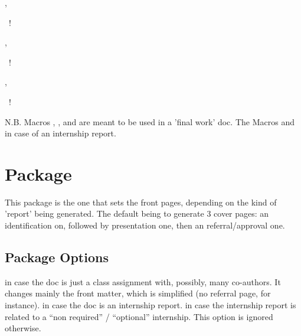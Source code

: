 \documentclass[dctools,english,tocdepth=3,secdepth=3]{ufrgscca} %
\begin{document}
\begin{Macros}{\altexaminer,\altexaminerinfo}%
	\begin{Syntax}%
		~\Macro!{\altexaminer}{}
	\end{Syntax}
\end{Macros}

\begin{Macros}{\tutor,\tutorinfo}%
\begin{Syntax}%
    ~\Macro!{\tutor}{}
\end{Syntax}
\end{Macros}

\begin{Macros}{\supervisor,\supervisorinfo}%
\begin{Syntax}%
    ~\Macro!{\supervisor}{}
\end{Syntax}
\end{Macros}

N.B. Macros \Macro{\advisor}{}, \Macro{\coadvisor}{}, \Macro{\examiner}{} and \Macro{\altexaminer}{} are meant to be used in a 'final work' doc. The Macros \Macro{\tutor}{} and \Macro{\supervisor}{} in case of an internship report.


\section{ Package}
This package is the one that sets the front pages, depending on the kind of 'report' being generated. The default being to generate 3 cover pages: an identification on, followed by presentation one, then an referral/approval one.

\subsection{Package Options}
\begin{Options}
	 in case the doc is just a class assignment with, possibly, many co-authors. It changes mainly the front matter, which is simplified (no referral page, for instance).
     in case the doc is an internship report.
     in case the internship report is related to a “non required” / “optional” internship. This option is ignored otherwise.

\end{Options}
\end{document}
